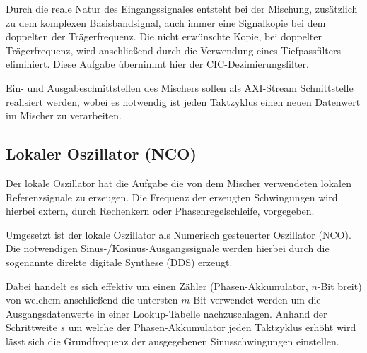 Durch die reale Natur des Eingangssignales entsteht bei der Mischung, zusätzlich zu dem komplexen Basisbandsignal, auch immer eine Signalkopie bei dem doppelten der Trägerfrequenz.
\cite{WPI_COSTAS}
Die nicht erwünschte Kopie, bei doppelter Trägerfrequenz, wird anschließend durch die Verwendung eines Tiefpassfilters eliminiert. 
Diese Aufgabe übernimmt hier der \acs{CIC}-Dezimierungsfilter.

Ein- und Ausgabeschnittstellen des Mischers sollen als \acs{AXI}-Stream Schnittstelle realisiert werden, wobei es notwendig ist jeden Taktzyklus einen neuen Datenwert
im Mischer zu verarbeiten. 

\subsection{Lokaler Oszillator (\acs{NCO})} \label{Sec:NCO}
Der lokale Oszillator hat die Aufgabe die von dem Mischer verwendeten lokalen Referenzsignale zu erzeugen.
Die Frequenz der erzeugten Schwingungen wird hierbei extern, durch Rechenkern oder Phasenregelschleife, vorgegeben. 

Umgesetzt ist der lokale Oszillator als Numerisch gesteuerter Oszillator (\acs{NCO}). 
Die notwendigen Sinus-/Kosinus-Ausgangssignale werden hierbei durch die sogenannte direkte digitale Synthese (\acs{DDS}) erzeugt.

Dabei handelt es sich effektiv um einen Zähler (Phasen-Akkumulator, $n$-Bit breit) von welchem anschließend die untersten $m$-Bit verwendet werden
um die Ausgangsdatenwerte in einer Lookup-Tabelle nachzuschlagen.
Anhand der Schrittweite $s$ um welche der Phasen-Akkumulator jeden Taktzyklus erhöht wird lässt sich die Grundfrequenz der ausgegebenen Sinusschwingungen einstellen.

